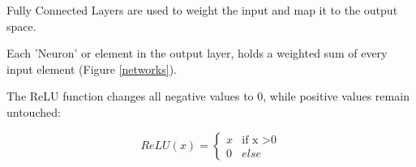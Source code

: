 Fully Connected Layers are used to weight the input and map it to the output space. 

Each 'Neuron' or element in the output layer, holds a weighted sum of every input element (Figure \ref{networks}).

The ReLU function changes all negative values to 0, while positive values remain untouched:

\begin{equation}
ReLU (x) = 
\begin{cases}
x & \text{if x >0} \\
0 & else
\end{cases}
\end{equation}


\pagebreak